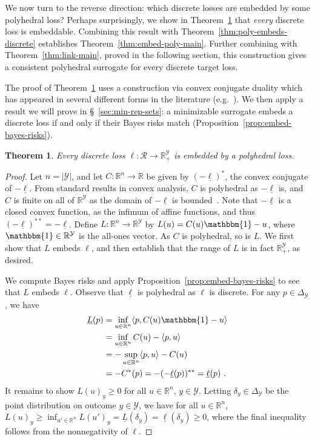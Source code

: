 \documentclass[11pt]{article}
\newcommand{\reals}{\mathbb{R}}
\newcommand{\simplex}{\Delta_\Y}
\newcommand{\R}{\mathcal{R}}
\newcommand{\Y}{\mathcal{Y}}
\newcommand{\risk}[1]{\underline{#1}}
\newcommand{\inprod}[2]{\langle #1, #2 \rangle}%
\newcommand{\ones}{\mathbbm{1}}
\newtheorem{theorem}{Theorem}
\begin{document}
We now turn to the reverse direction: which discrete losses are embedded by some polyhedral loss?
Perhaps surprisingly, we show in Theorem~\ref{thm:discrete-loss-poly-embeddable} that \emph{every} discrete loss is embeddable.
Combining this result with Theorem~\ref{thm:poly-embeds-discrete} establishes Theorem~\ref{thm:embed-poly-main}.
Further combining with Theorem~\ref{thm:link-main}, proved in the following section, this construction gives a consistent polyhedral surrogate for every discrete target loss.

The proof of Theorem~\ref{thm:discrete-loss-poly-embeddable} uses a construction via convex conjugate duality which has appeared in several different forms in the literature (e.g.\ \cite{duchi2018multiclass,abernethy2013efficient,frongillo2014general}).
We then apply a result we will prove in \S~\ref{sec:min-rep-sets}: a minimizable surrogate embeds a discrete loss if and only if their Bayes risks match (Proposition~\ref{prop:embed-bayes-risks}).

\begin{theorem}\label{thm:discrete-loss-poly-embeddable}
  Every discrete loss $\ell:\R \to \reals^\Y_+$ is embedded by a polyhedral loss.
\end{theorem}
\begin{proof}
  Let $n = |\Y|$, and let $C:\reals^n \to \reals$ be given by $(-\risk{\ell})^*$, the convex conjugate of $-\risk{\ell}$.
  From standard results in convex analysis, $C$ is polyhedral as $-\risk{\ell}$ is, and $C$ is finite on all of $\reals^\Y$ as the domain of $-\risk{\ell}$ is bounded~\cite[Corollary 13.3.1]{rockafellar1997convex}.
  Note that $-\risk{\ell}$ is a closed convex function, as the infimum of affine functions, and thus $(-\risk{\ell})^{**} = -\risk{\ell}$.
  Define $L:\reals^n\to\reals^\Y$ by $L(u) = C(u)\ones - u$, where $\ones\in\reals^\Y$ is the all-ones vector.
  As $C$ is polyhedral, so is $L$.
  We first show that $L$ embeds $\ell$, and then establish that the range of $L$ is in fact $\reals^\Y_+$, as desired.

  We compute Bayes risks and apply Proposition~\ref{prop:embed-bayes-risks} to see that $L$ embeds $\ell$.
  Observe that $\risk{\ell}$ is polyhedral as $\ell$ is discrete.
  For any $p\in\simplex$, we have
  \begin{align*}
    \risk{L}(p)
    &= \inf_{u\in\reals^n} \inprod{p}{C(u)\ones - u}\\
    &= \inf_{u\in\reals^n} C(u) - \inprod{p}{u}\\
    &= -\sup_{u\in\reals^n} \inprod{p}{u} - C(u)\\
    &= -C^*(p) = - (-\risk{\ell}(p))^{**} = \risk{\ell}(p)~.
  \end{align*}
  It remains to show $L(u)_y \geq 0$ for all $u\in\reals^n$, $y\in\Y$.
  Letting $\delta_y\in\simplex$ be the point distribution on outcome $y\in\Y$, we have for all $u\in\reals^n$, $L(u)_y \geq \inf_{u'\in\reals^n} L(u')_y = \risk{L}(\delta_y) = \risk{\ell}(\delta_y) \geq 0$, where the final inequality follows from the nonnegativity of $\ell$.
\end{proof}
\end{document}
